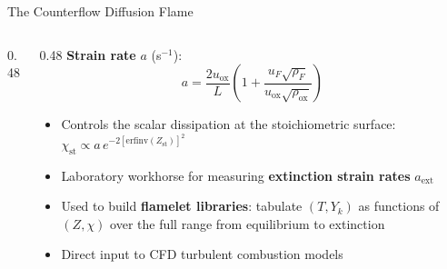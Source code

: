 \documentclass[12pt,aspectratio=169]{beamer}
\newcommand{\Zst}{Z_{\text{st}}}
\newcommand{\chist}{\chi_{\text{st}}}
\begin{document}
\begin{frame}{The Counterflow Diffusion Flame}
\begin{columns}
\begin{column}{0.48\textwidth}
    \end{column}
    \begin{column}{0.48\textwidth}
      \textbf{Strain rate} $a$ (s$^{-1}$):
      \[
        a = \frac{2 u_{\text{ox}}}{L}
          \left(1 + \frac{u_F\sqrt{\rho_F}}{u_{\text{ox}}\sqrt{\rho_{\text{ox}}}}\right)
      \]
      \begin{itemize}
        \item Controls the scalar dissipation at the stoichiometric
              surface: $\chist \propto a\,e^{-2[\text{erfinv}(\Zst)]^2}$
        \item Laboratory workhorse for measuring
              \textbf{extinction strain rates} $a_{\text{ext}}$
        \item Used to build \textbf{flamelet libraries}:
              tabulate $(T, Y_k)$ as functions of $(Z, \chi)$
              over the full range from equilibrium to extinction
        \item Direct input to CFD turbulent combustion models
      \end{itemize}
    \end{column}
  \end{columns}
\end{frame}
\end{document}
